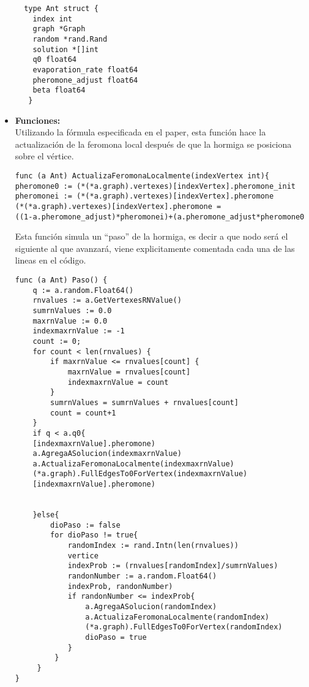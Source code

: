 \documentclass[a4paper, 11pt, spanish, oneside]{book}
\begin{document}
\begin{itemize}
 \begin{verbatim}
  type Ant struct {
    index int
    graph *Graph
    random *rand.Rand
    solution *[]int
    q0 float64
    evaporation_rate float64
    pheromone_adjust float64
    beta float64
   }

 \end{verbatim}
 \newpage
 \item\textbf{Funciones:}\\
 Utilizando la fórmula especificada en el paper, esta función hace la actualización de la feromona local después de que la hormiga se posiciona sobre el vértice.
 \begin{verbatim}
func (a Ant) ActualizaFeromonaLocalmente(indexVertex int){
pheromone0 := (*(*a.graph).vertexes)[indexVertex].pheromone_init
pheromonei := (*(*a.graph).vertexes)[indexVertex].pheromone
(*(*a.graph).vertexes)[indexVertex].pheromone = 
((1-a.pheromone_adjust)*pheromonei)+(a.pheromone_adjust*pheromone0
 \end{verbatim}
 Esta función simula un ``paso'' de la hormiga, es decir a que nodo será el siguiente al que avanzará, viene explicitamente comentada cada una de las lineas en el código.
 \begin{verbatim}
func (a Ant) Paso() {
    q := a.random.Float64()
    rnvalues := a.GetVertexesRNValue() 
    sumrnValues := 0.0
    maxrnValue := 0.0
    indexmaxrnValue := -1 
    count := 0;
    for count < len(rnvalues) {
        if maxrnValue <= rnvalues[count] {
            maxrnValue = rnvalues[count]
            indexmaxrnValue = count
        }
        sumrnValues = sumrnValues + rnvalues[count]
        count = count+1
    }
    if q < a.q0{
    [indexmaxrnValue].pheromone)
    a.AgregaASolucion(indexmaxrnValue)
    a.ActualizaFeromonaLocalmente(indexmaxrnValue)
    (*a.graph).FullEdgesTo0ForVertex(indexmaxrnValue)
    [indexmaxrnValue].pheromone)
        
    
    }else{
        dioPaso := false
        for dioPaso != true{
            randomIndex := rand.Intn(len(rnvalues))
            vertice
            indexProb := (rnvalues[randomIndex]/sumrnValues)
            randonNumber := a.random.Float64()
            indexProb, randonNumber)
            if randonNumber <= indexProb{
                a.AgregaASolucion(randomIndex)
                a.ActualizaFeromonaLocalmente(randomIndex)
                (*a.graph).FullEdgesTo0ForVertex(randomIndex)
                dioPaso = true
            }
         }
     }
}  
 \end{verbatim}
 

\end{itemize}
\end{document}
